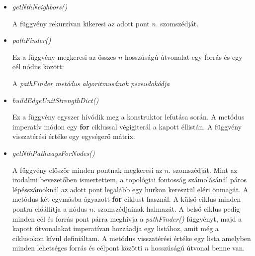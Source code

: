 \documentclass[a4paper,12pt]{article}
\newenvironment{imgdesc}{
		\small
		\singlespacing
		\begin{center}
		
	}{
		\end{center}	
	}
\begin{document}
		\begin{itemize}
			\item \textit{getNthNeighbors()}
			
			A függvény rekurzívan kikeresi az adott pont $n$. szomszédját.
		
			\item \textit{pathFinder()}
			
			Ez a függvény megkeresi az összes $n$ hosszúságú útvonalat egy forrás és egy cél nódus között:
			
			  		\begin{algorithm}[H]
						\footnotesize
						
						\SetAlgoVlined
						
						
						
			  		\end{algorithm}
			  		
			  		\begin{imgdesc}
			  			A \textit{pathFinder metódus algoritmusának pszeudokódja}
			  		\end{imgdesc}
			  		
			\item \textit{buildEdgeUnitStrengthDict()}
			
			Ez a függvény egyszer hívódik meg a konstruktor lefutása során. A metódus imperatív módon egy \textbf{for} ciklussal végigiterál a kapott éllistán. A függvény visszatérési értéke egy egységerő mátrix.
			  		
			\item \textit{getNthPathwaysForNodes()}
			
			A függvény először minden pontnak megkeresi az $n$. szomszédját.  Mint az irodalmi bevezetőben ismertettem, a topológiai fontosság számolásánál páros lépésszámoknál az adott pont legalább egy hurkon keresztül eléri önmagát. A metódus két egymásba ágyazott \textbf{for} ciklust használ. A külső ciklus minden pontra előállítja a nódus $n$. szomszédjainak halmazát. A belső ciklus pedig minden cél és forrás pont párra meghívja a \textit{pathFinder()} függvényt, majd a kapott útvonalakat imperatívan hozzáadja egy listához, amit még a ciklusokon kívül definiáltam. A metódus visszatérési értéke egy lista amelyben minden lehetséges forrás és célpont közötti $n$ hosszúságú útvonal benne van.
			

\end{itemize}
\end{document}

